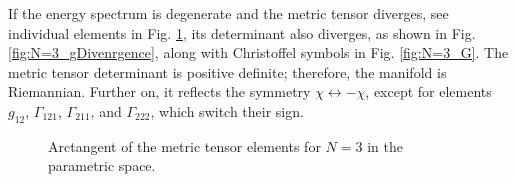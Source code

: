 If the energy spectrum is degenerate and the metric tensor diverges, see individual elements in Fig. \ref{fig:N=3_g}, its determinant also diverges, as shown in Fig. \ref{fig:N=3_gDivenrgence}, along with Christoffel symbols in Fig. \ref{fig:N=3_G}. The metric tensor determinant is positive definite; therefore, the manifold is Riemannian. Further on, it reflects the symmetry $\chi\leftrightarrow-\chi$, except for elements $g_{12}$, $\Gamma_{121}$, $\Gamma_{211}$, and $\Gamma_{222}$, which switch their sign.

\begin{figure}[H]
    \centering
\caption{Arctangent of the metric tensor elements for $N=3$ in the parametric space.}
    \label{fig:N=3_g}
\end{figure}

